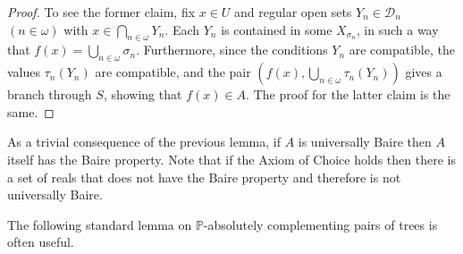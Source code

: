 \documentclass[fleqn, 11pt]{amsart}
\theoremstyle{plain}
\theoremstyle{definition}
\theoremstyle{remark}
\newcommand{\bfSigma}{\bf{\Sigma}}
\newcommand{\powerset}{\mathcal{P}}
\begin{document}
\begin{proof}
 To see the former claim, fix $x \in U$ and regular open sets $Y_{n} \in \mathcal{D}_{n}$ $(n \in \omega)$ with $x \in \bigcap_{n \in \omega} Y_{n}$. Each $Y_{n}$ is contained in some $X_{\sigma_{n}}$, in such a way that $f(x) = \bigcup_{n\in\omega}\sigma_{n}$. Furthermore, since the conditions $Y_{n}$ are compatible, the values $\tau_{n}(Y_{n})$ are compatible, and the pair $(f(x), \bigcup_{n \in \omega}\tau_{n}(Y_{n}))$ gives a branch through $S$, showing that $f(x) \in A$. The proof for the latter claim is the same. 
 \end{proof}
 
 

As a trivial consequence of the previous lemma, if $A$ is universally Baire then $A$ itself has the Baire property.
Note that if the Axiom of Choice holds then there is a set of reals that does not have the Baire property and therefore is not universally Baire.


% 
% 
% 
% 
% 
% 
% 
% 
% 

The following standard lemma on $\mathbb{P}$-absolutely complementing pairs of trees is often useful.
\end{document}
